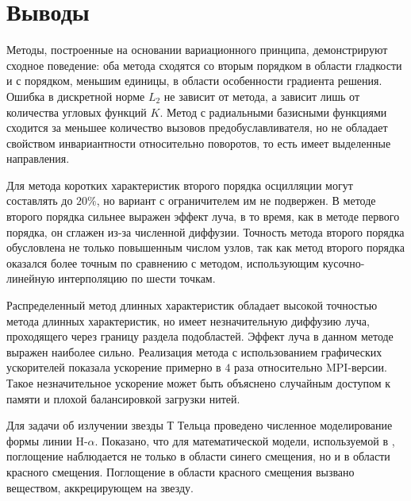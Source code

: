 \FloatBarrier

\section{Выводы}

Методы, построенные на основании вариационного принципа, демонстрируют сходное поведение: оба метода сходятся со вторым порядком в области гладкости и с порядком, меньшим единицы, в области особенности градиента решения. Ошибка в дискретной норме $L_2$ не зависит от метода, а зависит лишь от количества угловых функций $K$. Метод с радиальными базисными функциями сходится за меньшее количество вызовов предобуславливателя, но не обладает свойством инвариантности относительно поворотов, то есть имеет выделенные направления.

Для метода коротких характеристик второго порядка осцилляции могут составлять до $20\%$, но вариант с ограничителем им не подвержен. В методе второго порядка сильнее выражен эффект луча, в то время, как в методе первого порядка, он сглажен из-за численной диффузии. Точность метода второго порядка обусловлена не только повышенным числом узлов, так как метод второго порядка оказался более точным по сравнению с методом, использующим кусочно-линейную интерполяцию по шести точкам.

Распределенный метод длинных характеристик обладает высокой точностью метода длинных характеристик, но имеет незначительную диффузию луча, проходящего через границу раздела подобластей. Эффект луча в данном методе выражен наиболее сильно. Реализация метода с использованием графических ускорителей показала ускорение примерно в $4$ раза относительно MPI-версии. Такое незначительное ускорение может быть объяснено случайным доступом к памяти и плохой балансировкой загрузки нитей.

Для задачи об излучении звезды Т Тельца проведено численное моделирование формы линии H-$\alpha$.  Показано, что для математической модели, используемой в \cite{romanova2009}, поглощение наблюдается не только в области синего смещения, но и в области красного смещения. Поглощение в области красного смещения вызвано веществом, аккрецирующем на звезду.
